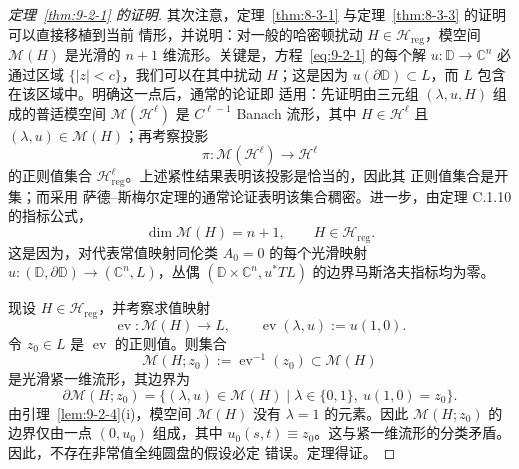 \begin{proof}[定理~\ref{thm:9-2-1} 的证明]
其次注意，定理~\ref{thm:8-3-1} 与定理~\ref{thm:8-3-3} 的证明可以直接移植到当前
情形，并说明：对一般的哈密顿扰动 $H\in\mathcal H_{\mathrm{reg}}$，模空间
$\mathcal M(H)$ 是光滑的 $n+1$ 维流形。关键是，方程~\eqref{eq:9-2-1} 的每个解
$u:\mathbb D\to\mathbb C^n$ 必通过区域 $\{|z|<c\}$，我们可以在其中扰动 $H$；这是因为
$u(\partial\mathbb D)\subset L$，而 $L$ 包含在该区域中。明确这一点后，通常的论证即
适用：先证明由三元组 $(\lambda,u,H)$ 组成的普适模空间
$\mathcal M(\mathcal H^\ell)$ 是 $C^{\ell-1}$ Banach 流形，其中
$H\in\mathcal H^\ell$ 且 $(\lambda,u)\in\mathcal M(H)$；再考察投影
\[
  \pi:\mathcal M(\mathcal H^\ell)\longrightarrow\mathcal H^\ell
\]
的正则值集合 $\mathcal H^\ell_{\mathrm{reg}}$。上述紧性结果表明该投影是恰当的，因此其
正则值集合是开集；而采用 萨德--斯梅尔定理的通常论证表明该集合稠密。进一步，由定理
C.1.10 的指标公式，
\[
  \dim\mathcal M(H)=n+1,
  \qquad H\in\mathcal H_{\mathrm{reg}}.
\]
这是因为，对代表常值映射同伦类 $A_0=0$ 的每个光滑映射
$u:(\mathbb D,\partial\mathbb D)\to(\mathbb C^n,L)$，丛偶
$(\mathbb D\times\mathbb C^n,u^*TL)$ 的边界马斯洛夫指标均为零。

现设 $H\in\mathcal H_{\mathrm{reg}}$，并考察求值映射
\[
  \operatorname{ev}:\mathcal M(H)\longrightarrow L,
  \qquad \operatorname{ev}(\lambda,u):=u(1,0).
\]
令 $z_0\in L$ 是 $\operatorname{ev}$ 的正则值。则集合
\[
  \mathcal M(H;z_0):=\operatorname{ev}^{-1}(z_0)\subset\mathcal M(H)
\]
是光滑紧一维流形，其边界为
\[
  \partial\mathcal M(H;z_0)
  =\{(\lambda,u)\in\mathcal M(H)\mid
      \lambda\in\{0,1\},\ u(1,0)=z_0\}.
\]
由引理~\ref{lem:9-2-4}(i)，模空间 $\mathcal M(H)$ 没有 $\lambda=1$ 的元素。因此
$\mathcal M(H;z_0)$ 的边界仅由一点 $(0,u_0)$ 组成，其中
$u_0(s,t)\equiv z_0$。这与紧一维流形的分类矛盾。因此，不存在非常值全纯圆盘的假设必定
错误。定理得证。
\end{proof}

